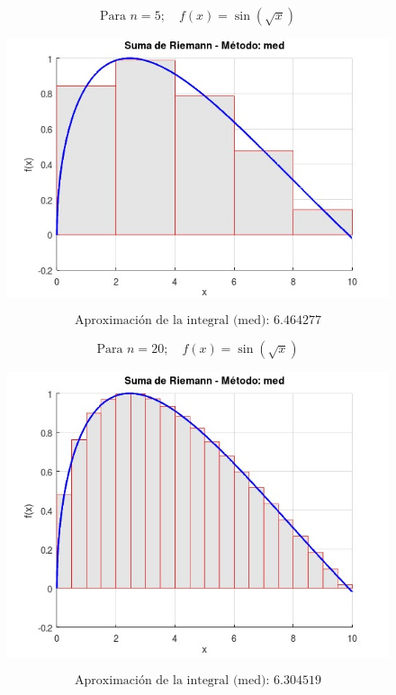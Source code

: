 \[
\text{Para } n = 5; \quad f(x) = \sin(\sqrt{x})
\]

\begin{figure}[H]
    \centering
    \includegraphics[scale=0.5]{images/1 n5.jpeg}
    \label{fig:riemann_med}
\end{figure}

\[
\text{Aproximación de la integral (med): } 6.464277
\]


\[
\text{Para } n = 20; \quad f(x) = \sin(\sqrt{x})
\]

\begin{figure}[H]
    \centering
    \includegraphics[scale=0.5]{images/2 n20.jpeg}
    \label{fig:riemann_med_n20}
\end{figure}

\[
\text{Aproximación de la integral (med): } 6.304519
\]


